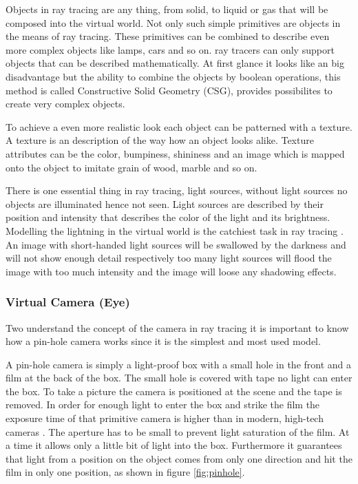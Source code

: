 \documentclass[DIV10, abstracton, openright, footsepline, headsepline, twoside, 9pt,
bigheadings]{scrreprt}
\begin{document}
Objects in ray tracing are any thing, from solid, to liquid or gas that will be
composed into the virtual world. Not only such simple primitives are objects
in the means of ray tracing. These primitives can be combined to describe even
more complex objects like lamps, cars and so on. ray tracers can only support
objects that can be described mathematically. At first glance it looks like an
big disadvantage but the ability to combine the objects by boolean
operations, this method is called Constructive Solid Geometry (CSG), provides
possibilites to create very complex objects.

To achieve a even more realistic look each object can be patterned with a
texture. A texture is an description of the way how an object looks alike.
Texture attributes can be the color, bumpiness, shininess and an image which
is mapped onto the object to imitate grain of wood, marble and so on.

There is one essential thing in ray tracing, light sources, without light
sources no objects are illuminated hence not seen. Light sources are described
by their position and intensity that describes the color of the light and its
brightness. Modelling the lightning in the virtual world is the catchiest task
in ray tracing \cite{Mosen98}. An image with short-handed light sources will be
swallowed by the darkness and will not show enough detail respectively too
many light sources will flood the image with too much intensity and the
image will loose any shadowing effects.

\subsubsection{Virtual Camera (Eye)}
Two understand the concept of the camera in ray tracing it is important to know
how a pin-hole camera works since it is the simplest and most used model.

A pin-hole camera is simply a light-proof box with a small hole in the front
and a film at the back of the box. The small hole is covered with tape no
light can enter the box. To take a picture the camera is positioned at the
scene and the tape is removed. In order for enough light to enter
the box and strike the film the exposure time of that primitive camera
is higher than in modern, high-tech cameras \cite{Glassner89}.
The aperture has to be small to prevent light saturation of the film. At a time
it allows only a little bit of light into the box. Furthermore it guarantees
that light from a position on the object comes from only one direction and hit
the film in only one position, as shown in figure \ref{fig:pinhole}.\\
\end{document}
